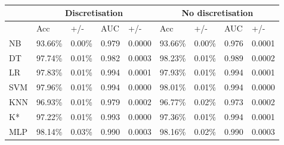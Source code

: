 \begin{table}[htbp]
\caption{}
\begin{tabular}{|l|r|r|r|r|r|r|r|r|}
\hline
 & \multicolumn{ 4}{c|}{Discretisation} & \multicolumn{ 4}{c|}{No discretisation} \\ \hline
 & \multicolumn{1}{l|}{Acc} & \multicolumn{1}{l|}{+/-} & \multicolumn{1}{l|}{AUC} & \multicolumn{1}{l|}{+/-} & \multicolumn{1}{l|}{Acc} & \multicolumn{1}{l|}{+/-} & \multicolumn{1}{l|}{AUC} & \multicolumn{1}{l|}{+/-} \\ \hline
NB & 93.66\% & 0.00\% & 0.979 & 0.0000 & 93.66\% & 0.00\% & 0.976 & 0.0001 \\ \hline
DT & 97.74\% & 0.01\% & 0.982 & 0.0003 & 98.23\% & 0.01\% & 0.989 & 0.0002 \\ \hline
LR & 97.83\% & 0.01\% & 0.994 & 0.0001 & 97.93\% & 0.01\% & 0.994 & 0.0001 \\ \hline
SVM & 97.96\% & 0.01\% & 0.994 & 0.0000 & 98.01\% & 0.01\% & 0.994 & 0.0000 \\ \hline
KNN & 96.93\% & 0.01\% & 0.979 & 0.0002 & 96.77\% & 0.02\% & 0.973 & 0.0002 \\ \hline
K* & 97.22\% & 0.01\% & 0.993 & 0.0000 & 97.36\% & 0.01\% & 0.994 & 0.0001 \\ \hline
MLP & 98.14\% & 0.03\% & 0.990 & 0.0003 & 98.16\% & 0.02\% & 0.990 & 0.0003 \\ \hline
\end{tabular}
\label{}
\end{table}

